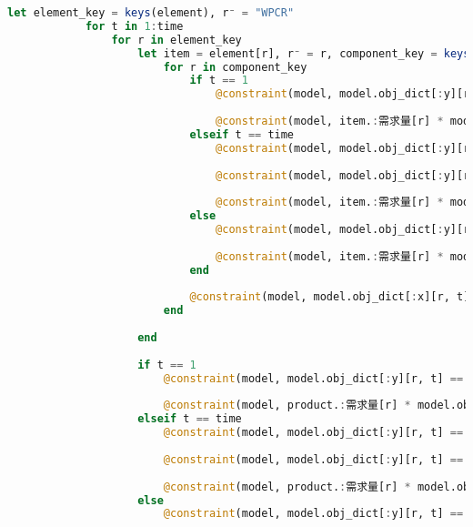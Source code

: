 \begin{appendices}
\begin{lstlisting}[language=julia]
        let element_key = keys(element), r⁻ = "WPCR"
            for t in 1:time
                for r in element_key
                    let item = element[r], r⁻ = r, component_key = keys(item.:组件)
                        for r in component_key
                            if t == 1
                                @constraint(model, model.obj_dict[:y][r, t] == 0 + model.obj_dict[:x][r, t] - item.:需求量[r] * model.obj_dict[:x][r⁻, t])
    
                                @constraint(model, item.:需求量[r] * model.obj_dict[:x][r⁻, t] <= 0)
                            elseif t == time
                                @constraint(model, model.obj_dict[:y][r, t] == model.obj_dict[:y][r, t-1] + model.obj_dict[:x][r, t] - item.:需求量[r] * model.obj_dict[:x][r⁻, t])
    
                                @constraint(model, model.obj_dict[:y][r, t] == 0)
    
                                @constraint(model, item.:需求量[r] * model.obj_dict[:x][r⁻, t] <= model.obj_dict[:y][r, t-1])
                            else
                                @constraint(model, model.obj_dict[:y][r, t] == model.obj_dict[:y][r, t-1] + model.obj_dict[:x][r, t] - item.:需求量[r] * model.obj_dict[:x][r⁻, t])
    
                                @constraint(model, item.:需求量[r] * model.obj_dict[:x][r⁻, t] <= model.obj_dict[:y][r, t-1])
                            end
    
                            @constraint(model, model.obj_dict[:x][r, t] == model.obj_dict[:x][r, t] * model.obj_dict[:ω][r, t])
                        end
    
                    end
    
                    if t == 1
                        @constraint(model, model.obj_dict[:y][r, t] == 0 + model.obj_dict[:x][r, t] - product.:需求量[r] * model.obj_dict[:x][r⁻, t])
    
                        @constraint(model, product.:需求量[r] * model.obj_dict[:x][r⁻, t] <= 0)
                    elseif t == time
                        @constraint(model, model.obj_dict[:y][r, t] == model.obj_dict[:y][r, t-1] + model.obj_dict[:x][r, t] - product.:需求量[r] * model.obj_dict[:x][r⁻, t])
    
                        @constraint(model, model.obj_dict[:y][r, t] == 0)
    
                        @constraint(model, product.:需求量[r] * model.obj_dict[:x][r⁻, t] <= model.obj_dict[:y][r, t-1])
                    else
                        @constraint(model, model.obj_dict[:y][r, t] == model.obj_dict[:y][r, t-1] + model.obj_dict[:x][r, t] - product.:需求量[r] * model.obj_dict[:x][r⁻, t])
    

\end{lstlisting}
\end{appendices}
